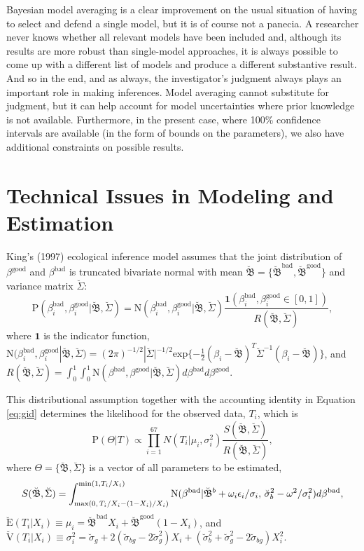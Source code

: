\documentclass[11pt,titlepage]{article}
\newcommand{\bbetau}{\breve{\mathfrak B}}
\newcommand{\sigmau}{\breve{\sigma}}
\newcommand{\Sigmau}{\breve{\Sigma}}
\newcommand{\Eu}{\breve{\text{E}}}
\newcommand{\Vu}{\breve{\text{V}}}
\newcommand{\N}{\text{N}}
\renewcommand{\P}{\text{P}}
\newcommand{\bb}{\beta^{\text{bad}}}
\newcommand{\bg}{\beta^{\text{good}}}
\begin{document}
Bayesian model averaging is a clear improvement on the usual situation
of having to select and defend a single model, but it is of course not
a panecia. A researcher never knows whether all relevant models have
been included and, although its results are more robust than
single-model approaches, it is always possible to come up with a
different list of models and produce a different substantive result.
And so in the end, and as always, the investigator's judgment always
plays an important role in making inferences.  Model averaging cannot
substitute for judgment, but it can help account for model
uncertainties where prior knowledge is not available. Furthermore, in
the present case, where 100\% confidence intervals are available (in
the form of bounds on the parameters), we also have additional
constraints on possible results.

\appendix
\section{Technical Issues in Modeling and Estimation} \label{appx:king}

King's (1997) ecological inference model assumes that the joint
distribution of $\bg$ and $\bb$ is truncated bivariate normal with
mean $\bbetau=\{\bbetau^{\text{bad}},\bbetau^{\text{good}}\}$
and variance matrix $\Sigmau$:
\begin{equation}
\P(\bb_i, \bg_i | \bbetau, \Sigmau)  = 
 \N (\bb_i, \bg_i | \bbetau, \Sigmau)
\frac{\mathbf{1}(\bb_i, \bg_i \in [0,1])}
{R(\bbetau, \Sigmau)},
\end{equation}
where $\mathbf{1}$ is the indicator function, $\N (\bb_i, \bg_i |
\bbetau, \Sigmau) = (2 \pi)^{-1/2} |\Sigmau|^{-1/2} \text{exp} \{ -
\frac{1}{2} (\beta_i-\bbetau)^T \Sigmau^{-1} (\beta_i - \bbetau) \}$,
and $R (\bbetau, \Sigmau) = \int_0^1 \int_0^1 \N (\bb, \bg | \bbetau,
\Sigmau) d\bb d\bg$.

This distributional assumption together with the accounting identity
in Equation \ref{eq:gid} determines the likelihood for the observed
data, $T_i$, which is
\begin{equation}
  \P(\Theta|T) \propto \prod_{i=1}^{67} N(T_i|\mu_i, \sigma_i^2)
  \frac{S(\bbetau, \Sigmau)}{R(\bbetau, \Sigmau)}, \label{eq:likelihood}
\end{equation}
where $\Theta=\{\bbetau,\Sigmau\}$ is a vector of all parameters to be
estimated,
\begin{equation}
  S(\bbetau, \Sigmau)=\int_{\text{max}(0,\thinspace T_i/X_i-(1-X_i)/X_i)}
  ^{\text{min}(1,T_i/X_i)} \N(\bb|\bbetau^b + \omega_i \epsilon_i /
  \sigma_i,\thinspace \sigmau^2_b-\omega^2/\sigma^2_i)d\bb,
\end{equation}
$\Eu(T_i|X_i)\equiv\mu_i = \bbetau^{\text{bad}} X_i +
\bbetau^{\text{good}} (1-X_i)$, and
$\Vu(T_i|X_i)\equiv\sigma^2_i=\sigmau_g + 2(\sigmau_{bg} - 2
\sigmau_g^2) X_i + (\sigmau_b^2 + \sigmau_g^2 - 2\sigmau_{bg}) X_i^2$.
\end{document}
